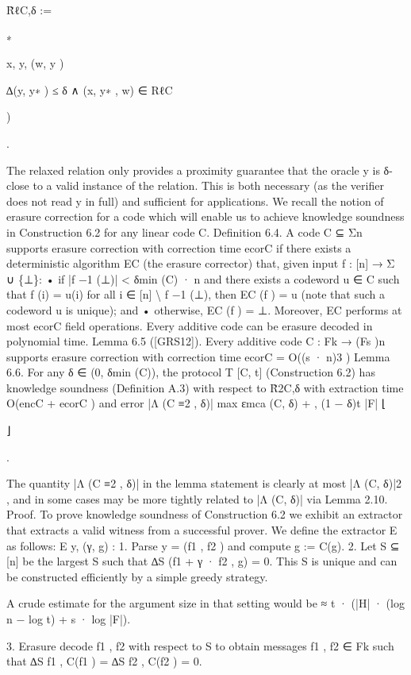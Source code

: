 \documentclass[11pt]{article}
\begin{document}
R̃ℓC,δ :=

∗ 

x, y, (w, y )

∆(y, y∗ ) ≤ δ
∧ (x, y∗ , w) ∈ RℓC

)

.

The relaxed relation only provides a proximity guarantee that the oracle y is δ-close to a valid
instance of the relation. This is both necessary (as the verifier does not read y in full) and sufficient
for applications. We recall the notion of erasure correction for a code which will enable us to achieve
knowledge soundness in Construction 6.2 for any linear code C.
Definition 6.4. A code C ⊆ Σn supports erasure correction with correction time ecorC if there
exists a deterministic algorithm EC (the erasure corrector) that, given input f : [n] → Σ ∪ \{⊥\}:
• if |f −1 (⊥)| < δmin (C) · n and there exists a codeword u ∈ C such that f (i) = u(i) for all i ∈
[n] \textbackslash{} f −1 (⊥), then EC (f ) = u (note that such a codeword u is unique); and
• otherwise, EC (f ) = ⊥.
Moreover, EC performs at most ecorC field operations.
Every additive code can be erasure decoded in polynomial time.
Lemma 6.5 ([GRS12]). Every additive code C : Fk → (Fs )n supports erasure correction with correction time ecorC = O((s · n)3 )
Lemma 6.6. For any δ ∈ (0, δmin (C)), the protocol T [C, t] (Construction 6.2) has knowledge soundness (Definition A.3) with respect to R̃2C,δ with extraction time O(encC + ecorC ) and error
|Λ (C ≡2 , δ)|
max εmca (C, δ) +
, (1 − δ)t
|F|
⌊

⌋

.

The quantity |Λ (C ≡2 , δ)| in the lemma statement is clearly at most |Λ (C, δ)|2 , and in some cases
may be more tightly related to |Λ (C, δ)| via Lemma 2.10.
Proof. To prove knowledge soundness of Construction 6.2 we exhibit an extractor that extracts a
valid witness from a successful prover. We define the extractor E as follows:
E y, (γ, g) :
1. Parse y = (f1 , f2 ) and compute g := C(g).
2. Let S ⊆ [n] be the largest S such that ∆S (f1 + γ · f2 , g) = 0. This S is unique and can be
constructed efficiently by a simple greedy strategy.



A crude estimate for the argument size in that setting would be ≈ t · (|H| · (log n − log t) + s · log |F|).

3. Erasure decode f1 , f2 with respect to S to obtain messages f1 , f2 ∈ Fk such that
∆S f1 , C(f1 ) = ∆S f2 , C(f2 ) = 0.
\end{document}
